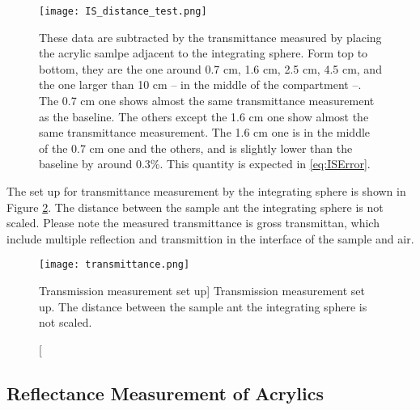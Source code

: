 \begin{figure}
    \centering
    \texttt{[image: IS\_distance\_test.png]}
    \caption[Example of transmittance measured in different distance from the integrating sphere.]
{
These data are subtracted by the transmittance measured by placing the acrylic samlpe adjacent to the integrating sphere.
Form top to bottom, they are the one around 0.7 cm, 1.6 cm, 2.5 cm, 4.5 cm,
and the one larger than 10 cm -- in the middle of the compartment --. The 0.7 cm one shows almost the same transmittance measurement as the baseline.
The others except the 1.6 cm one show almost the same transmittance measurement. The 1.6 cm one is in the middle of the 0.7 cm one and the others,
and is slightly lower than the baseline by around 0.3\%. This quantity is expected in \ref{eq:ISError}.
}
    \label{fig:IS_distance_test.png}
    \end{figure}


The set up for transmittance measurement by the integrating sphere is shown in Figure \ref{fig:transmission.png}.
The distance between the sample ant the integrating sphere is not scaled. Please note the measured transmittance
is gross transmittan, which include multiple reflection and transmittion in the interface of the sample and air.


\begin{figure}
    \centering
    \texttt{[image: transmittance.png]}
    \caption
    [Transmission measurement set up]
    {Transmission measurement set up. The distance between the sample ant the integrating sphere is not scaled.}
    \label{fig:transmission.png}
    \end{figure}




\subsection{Reflectance Measurement of Acrylics}


